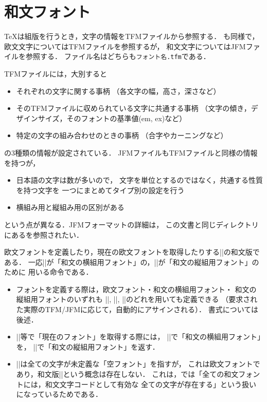\documentclass[a4paper,11pt,nomag,dvipdfmx]{jsarticle}
\def\code#1{\texttt{#1}}
\begin{document}
\section{和文フォント}
\label{sec:ptexfont}

\TeX は組版を行うとき，文字の情報をTFMファイルから参照する．
\pTeX も同様で，欧文文字についてはTFMファイルを参照するが，
和文文字についてはJFMファイルを参照する．
ファイル名はどちらも\code{フォント名.tfm}である．

TFMファイルには，大別すると
\begin{itemize}
 \item それぞれの文字に関する事柄
   （各文字の幅，高さ，深さなど）
 \item そのTFMファイルに収められている文字に共通する事柄
   （文字の傾き，デザインサイズ，そのフォントの基準値(em, ex)など）
 \item 特定の文字の組み合わせのときの事柄
   （合字やカーニングなど）
\end{itemize}
の3種類の情報が設定されている．
JFMファイルもTFMファイルと同様の情報を持つが，
\begin{itemize}
 \item 日本語の文字は数が多いので，
   文字を単位とするのではなく，共通する性質を持つ文字を
   一つにまとめてタイプ別の設定を行う
 \item 横組み用と縦組み用の区別がある
\end{itemize}
という点が異なる．JFMフォーマットの詳細は，
この文書と同じディレクトリにある\cite{jfm}を参照されたい．


\begin{cslist}
  欧文フォントを定義したり，現在の欧文フォントを取得したりする|\font|の和文版である．
  一応|\jfont|が「和文の横組用フォント」の，|\tfont|が「和文の縦組用フォント」のために
  用いる命令である．
\begin{itemize}
 \item フォントを定義する際は，欧文フォント・和文の横組用フォント・
       和文の縦組用フォントのいずれも
       |\font|, |\jfont|, |\tfont|のどれを用いても定義できる
       （要求された実際のTFM/JFMに応じて，自動的にアサインされる）．
       書式については後述．
 \item |\the|等で「現在のフォント」を取得する際には，
       |\jfont|で「和文の横組用フォント」を，
       |\tfont|で「和文の縦組用フォント」を返す．
 \item |\nullfont|は全ての文字が未定義な「空フォント」を指すが，
  これは欧文フォントであり，和文版|\nullfont|という概念は存在しない．
  これは，\pTeX では「全ての和文フォントには，和文文字コードとして有効な
  全ての文字が存在する」という扱いになっているためである．
\end{itemize}
\end{cslist}
\end{document}
